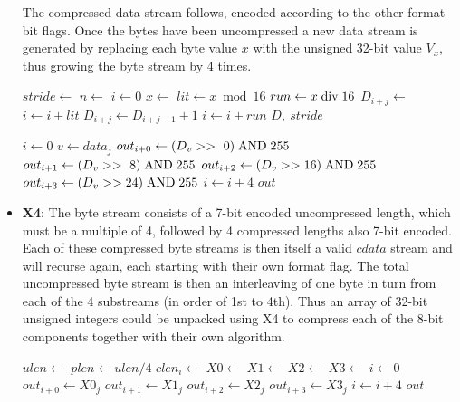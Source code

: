 \documentclass[a4paper]{article}
\begin{document}
\begin{itemize}
The compressed data stream follows, encoded according to the other
format bit flags. Once the bytes have been uncompressed a new data
stream is generated by replacing each byte value $x$ with the unsigned
32-bit value $V_x$, thus growing the byte stream by 4 times.

\begin{algorithmic}[1]
  \State $stride \gets $
  \State $n \gets $
  \State $i \gets 0$
    \State $x \gets $
    \State $lit \gets x \bmod 16$
    \State $run \gets x \bdiv 16$
      \State $D_{i+j} \gets $
    \EndFor
    \State $i \gets i + lit$
        \State $D_{i+j} \gets D_{i+j-1}+1$
      \EndFor
      \State $i \gets i + run$
    \EndIf
  \EndWhile
  \State \Return $D,\ stride$
\EndFunction
\end{algorithmic}

\begin{algorithmic}[1]
  \State $i \gets 0$
  \State $v \gets data_j$
  \State $out_{i+0} \gets (D_v >> \ 0) \bitand 255$
  \State $out_{i+1} \gets (D_v >> \ 8) \bitand 255$
  \State $out_{i+2} \gets (D_v >> 16) \bitand 255$
  \State $out_{i+3} \gets (D_v >> 24) \bitand 255$
  \State $i \gets i + 4$ 
 \EndFor
  \State \Return $out$
\EndFunction
\end{algorithmic}

\item{\textbf{X4}:}
The byte stream consists of a 7-bit encoded uncompressed length, which
must be a multiple of 4, followed by 4 compressed lengths also 7-bit
encoded.  Each of these compressed byte streams is then itself a valid
$cdata$ stream and will recurse again, each starting with their own
format flag.  The total uncompressed byte stream is then an
interleaving of one byte in turn from each of the 4 substreams (in
order of 1st to 4th).  Thus an array of 32-bit unsigned integers could
be unpacked using X4 to compress each of the 8-bit components together
with their own algorithm.

\begin{algorithmic}[1]
  \State $ulen \gets $
  \State $plen \gets ulen / 4$
   
    \State $clen_i \gets $
  \EndFor
  \State $X0 \gets $ 
  \State $X1 \gets $
  \State $X2 \gets $
  \State $X3 \gets $
  \Statex
  \State $i \gets 0$
   
    \State $out_{i+0} \gets X0_j$
    \State $out_{i+1} \gets X1_j$
    \State $out_{i+2} \gets X2_j$
    \State $out_{i+3} \gets X3_j$
    \State $i \gets i+4$
  \EndFor
  \State \Return $out$
\EndFunction
\end{algorithmic}


\end{itemize}
\end{document}
